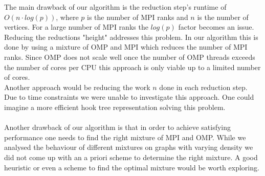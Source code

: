 The main drawback of our algorithm is the reduction step's runtime of $O\left(n \cdot log\left(p\right)\right)$, where $p$ is the number of MPI ranks and $n$ is the number of vertices. For a large number of MPI ranks the $log\left(p\right)$ factor becomes an issue.\\
Reducing the reductions "height" addresses this problem. In our algorithm this is done by using a mixture of OMP and MPI which reduces the number of MPI ranks. Since OMP does not scale well once the number of OMP threads exceeds the number of cores per CPU this approach is only viable up to a limited number of cores.\\
Another approach would be reducing the work $n$ done in each reduction step. Due to time constraints we were unable to investigate this approach. One could imagine a more efficient hook tree representation solving this problem.\\
\\
Another drawback of our algorithm is that in order to achieve satisfying performance one needs to find the right mixture of MPI and OMP. While we analysed the behaviour of different mixtures on graphs with varying density we did not come up with an a priori scheme to determine the right mixture. A good heuristic or even a scheme to find the optimal mixture would be worth exploring.